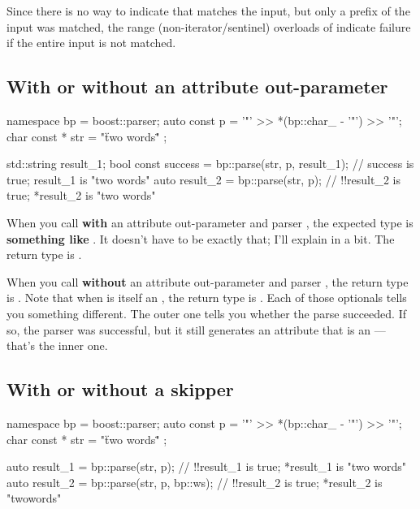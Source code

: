 \documentclass{MyBook}
\begin{document}
Since there is no way to indicate that  matches the input, but only a prefix of the input was matched, the range (non-iterator/sentinel) overloads of  indicate failure if the entire input is not matched.

\subsection{With or without an attribute out-parameter}

\begin{code}
namespace bp = boost::parser;
auto const p = '"' >> *(bp::char_ - '"') >> '"';
char const * str = "\"two words\"" ;

std::string result_1;
bool const success = bp::parse(str, p, result_1);   // success is true; result_1 is "two words"
auto result_2 = bp::parse(str, p);                  // !!result_2 is true; *result_2 is "two words"
\end{code}

When you call  \textbf{with} an attribute out-parameter and parser , the expected type is \textbf{something like} \emph{}. It doesn't have to be exactly that; I'll explain in a bit. The return type is .

When you call  \textbf{without} an attribute out-parameter and parser , the return type is \emph{}. Note that when \emph{} is itself an , the return type is . Each of those optionals tells you something different. The outer one tells you whether the parse succeeded. If so, the parser was successful, but it still generates an attribute that is an  --- that's the inner one.

\subsection{With or without a skipper}

\begin{code}
namespace bp = boost::parser;
auto const p = '"' >> *(bp::char_ - '"') >> '"';
char const * str = "\"two words\"" ;

auto result_1 = bp::parse(str, p);         // !!result_1 is true; *result_1 is "two words"
auto result_2 = bp::parse(str, p, bp::ws); // !!result_2 is true; *result_2 is "twowords"
\end{code}
\end{document}
